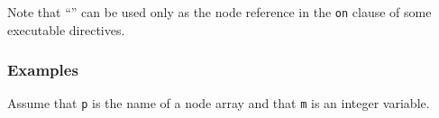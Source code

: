 %

Note that ``{\tt *}'' can be used only as the node reference in
the {\tt on} clause of some executable directives.


\subsubsection*{Examples}

Assume that {\tt p} is the name of a node array and that {\tt m} is an
integer variable.

